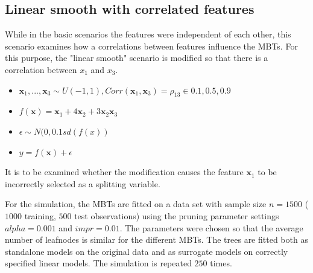 \newpage
\subsection{Linear smooth with correlated features}
While in the basic scenarios the features were independent of each other, this scenario examines how a correlations between features influence the MBTs. For this purpose, the "linear smooth" scenario is modified so that there is a correlation between $x_1$ and $x_3$.
\begin{itemize}
    \item $\textbf{x}_1,..., \textbf{x}_3 \sim U(-1,1), Corr(\textbf{x}_1, \textbf{x}_3) = \rho_{13} \in {0.1, 0.5, 0.9}$
    \item $ f(\textbf{x}) = \textbf{x}_1 + 4   \textbf{x}_2 + 3   \textbf{x}_2   \textbf{x}_3 $
    \item $\epsilon \sim N(0, 0.1 sd(f(x))$
    \item $y = f(\textbf{x}) + \epsilon$
\end{itemize}

              
It is to be examined whether the modification causes the feature $\textbf{x}_1$ to be incorrectly selected as a splitting variable.


For the simulation, the MBTs are fitted on a data set with sample size $ n = 1500$ ($1000$ training, $500$ test observations) using the pruning parameter settings $alpha = 0.001$ and $impr = 0.01$. The parameters were chosen so that the average number of leafnodes is similar for the different MBTs. The trees are fitted both as standalone models on the original data and as surrogate models on correctly specified linear models. The simulation is repeated $250$ times.


